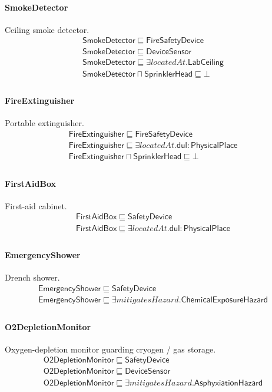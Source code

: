 \documentclass[10pt]{article}
\begin{document}
\paragraph{SmokeDetector} Ceiling smoke detector.
\[\begin{array}{l}
\mathsf{SmokeDetector} \sqsubseteq  \mathsf{FireSafetyDevice} \\
\mathsf{SmokeDetector} \sqsubseteq  \mathsf{DeviceSensor} \\
\mathsf{SmokeDetector} \sqsubseteq  \exists \mathit{locatedAt}.\mathsf{LabCeiling} \\
\mathsf{SmokeDetector} \sqcap  \mathsf{SprinklerHead} \sqsubseteq  \bot  \\
\end{array}\]
\paragraph{FireExtinguisher} Portable extinguisher.
\[\begin{array}{l}
\mathsf{FireExtinguisher} \sqsubseteq  \mathsf{FireSafetyDevice} \\
\mathsf{FireExtinguisher} \sqsubseteq  \exists \mathit{locatedAt}.\mathsf{dul{:}PhysicalPlace} \\
\mathsf{FireExtinguisher} \sqcap  \mathsf{SprinklerHead} \sqsubseteq  \bot  \\
\end{array}\]
\paragraph{FirstAidBox} First-aid cabinet.
\[\begin{array}{l}
\mathsf{FirstAidBox} \sqsubseteq  \mathsf{SafetyDevice} \\
\mathsf{FirstAidBox} \sqsubseteq  \exists \mathit{locatedAt}.\mathsf{dul{:}PhysicalPlace} \\
\end{array}\]
\paragraph{EmergencyShower} Drench shower.
\[\begin{array}{l}
\mathsf{EmergencyShower} \sqsubseteq  \mathsf{SafetyDevice} \\
\mathsf{EmergencyShower} \sqsubseteq  \exists \mathit{mitigatesHazard}.\mathsf{ChemicalExposureHazard} \\
\end{array}\]
\paragraph{O2DepletionMonitor} Oxygen-depletion monitor guarding cryogen / gas storage.
\[\begin{array}{l}
\mathsf{O2DepletionMonitor} \sqsubseteq  \mathsf{SafetyDevice} \\
\mathsf{O2DepletionMonitor} \sqsubseteq  \mathsf{DeviceSensor} \\
\mathsf{O2DepletionMonitor} \sqsubseteq  \exists \mathit{mitigatesHazard}.\mathsf{AsphyxiationHazard} \\
\end{array}\]
\end{document}
